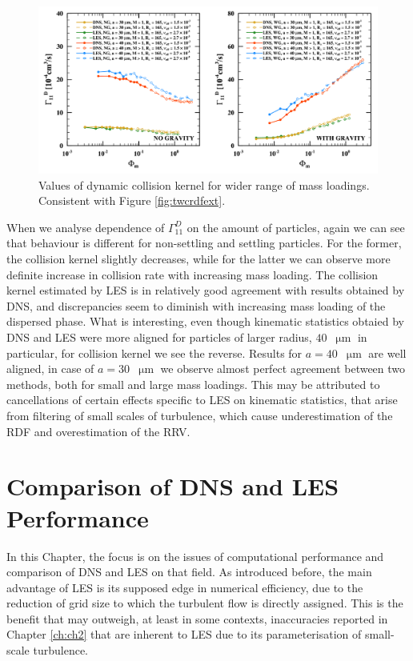 \documentclass{pracamgren}
\begin{document}
\begin{figure}[h]
\centering
\includegraphics[width=13.5cm]{img/plots/2-2-3f-twcgammaext.pdf}
\caption{
Values of dynamic collision kernel for wider range of mass loadings.
Consistent with Figure \ref{fig:twcrdfext}.
}
\label{fig:twcgammaext}
\end{figure}

When we analyse dependence of $\Gamma^D_{11}$ on the amount of particles, again we can see that behaviour is different for non-settling and settling particles.
For the former, the collision kernel slightly decreases, while for the latter we can observe more definite increase in collision rate with increasing mass loading.
The collision kernel estimated by LES is in relatively good agreement with results obtained by DNS, and discrepancies seem to diminish with increasing mass loading of the dispersed phase.
What is interesting, even though kinematic statistics obtaied by DNS and LES were more aligned for particles of larger radius, $40$~$\upmu\text{m}$ in particular, for collision kernel we see the reverse.
Results for $a = 40$~$\upmu\text{m}$ are well aligned, in case of $a = 30$~$\upmu\text{m}$ we observe almost perfect agreement between two methods, both for small and large mass loadings.
This may be attributed to cancellations of certain effects specific to LES on kinematic statistics, that arise from filtering of small scales of turbulence, which cause underestimation of the RDF and overestimation of the RRV.





\chapter{Comparison of DNS and LES Performance}
\label{ch:ch3}

In this Chapter, the focus is on the issues of computational performance and comparison of DNS and LES on that field.
As introduced before, the main advantage of LES is its supposed edge in numerical efficiency, due to the reduction of grid size to which the turbulent flow is directly assigned.
This is the benefit that may outweigh, at least in some contexts, inaccuracies reported in Chapter \ref{ch:ch2} that are inherent to LES due to its parameterisation of small-scale turbulence.
\end{document}
